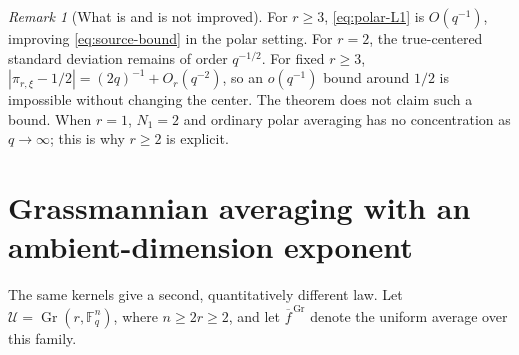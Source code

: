 \documentclass[11pt,a4paper]{article}
\theoremstyle{definition}
\theoremstyle{remark}
\newtheorem{remark}[theorem]{Remark}
\newcommand{\F}{\mathbb F}
\newcommand{\Gr}{\operatorname{Gr}}
\begin{document}
\begin{remark}[What is and is not improved]
For $r\ge3$, \eqref{eq:polar-L1} is $O(q^{-1})$, improving
\eqref{eq:source-bound} in the polar setting. For $r=2$, the true-centered
standard deviation remains of order $q^{-1/2}$. For fixed $r\ge3$,
$|\pi_{r,\xi}-1/2|=(2q)^{-1}+O_r(q^{-2})$, so an $o(q^{-1})$ bound
around $1/2$ is impossible without changing the center. The theorem does
not claim such a bound. When $r=1$, $N_1=2$ and ordinary polar averaging
has no concentration as $q\to\infty$; this is why $r\ge2$ is explicit.
\end{remark}

\section{Grassmannian averaging with an ambient-dimension exponent}
\label{sec:grassmann}
The same kernels give a second, quantitatively different law. Let
$\mathcal U=\Gr(r,\F_q^n)$, where $n\ge2r\ge2$, and let
$\overline f^{\,\mathrm{Gr}}$ denote the uniform average over this family.
\end{document}
